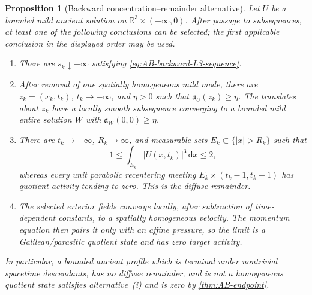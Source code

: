 \documentclass[11pt]{amsart}
\numberwithin{equation}{section}
\theoremstyle{plain}
\newtheorem{proposition}[proposition]{Proposition}
\theoremstyle{definition}
\theoremstyle{remark}
\newcommand{\R}{\mathbb R}
\newcommand{\dd}{\,\mathrm d}
\begin{document}
\begin{proposition}[Backward concentration--remainder alternative]
\label{prop:backward-concentration-remainder}
Let \(U\) be a bounded mild ancient solution on
\(\R^3\times(-\infty,0)\).  After passage to subsequences, at least one of
the following conclusions can be selected; the first applicable conclusion
in the displayed order may be used.
\begin{enumerate}[label=\textup{(\roman*)},leftmargin=2.2em]
\item There are \(s_k\downarrow-\infty\) satisfying
\eqref{eq:AB-backward-L3-sequence}.
\item After removal of one spatially homogeneous mild mode, there are
\(z_k=(x_k,t_k)\), \(t_k\to-\infty\), and \(\eta>0\) such that
\(\mathfrak a_U(z_k)\ge\eta\).  The translates about \(z_k\) have a
locally smooth subsequence converging to a bounded mild entire solution
\(W\) with \(\mathfrak a_W(0,0)\ge\eta\).
\item There are \(t_k\to-\infty\), \(R_k\to\infty\), and measurable
sets \(E_k\subset\{|x|>R_k\}\) such that
\begin{equation}\label{eq:diffuse-tail-mass}
 1\le\int_{E_k}|U(x,t_k)|^3\dd x\le2,
\end{equation}
whereas every unit parabolic recentering meeting
\(E_k\times(t_k-1,t_k+1)\) has quotient activity tending to zero.  This is
the diffuse remainder.
\item The selected exterior fields converge locally, after subtraction of
time-dependent constants, to a spatially homogeneous velocity.  The momentum
equation then pairs it only with an affine pressure, so the limit is a
Galilean/parasitic quotient state and has zero target activity.
\end{enumerate}
In particular, a bounded ancient profile which is terminal under nontrivial
spacetime descendants, has no diffuse remainder, and is not a homogeneous
quotient state satisfies alternative~\textup{(i)} and is zero by
\cref{thm:AB-endpoint}.
\end{proposition}
\end{document}
